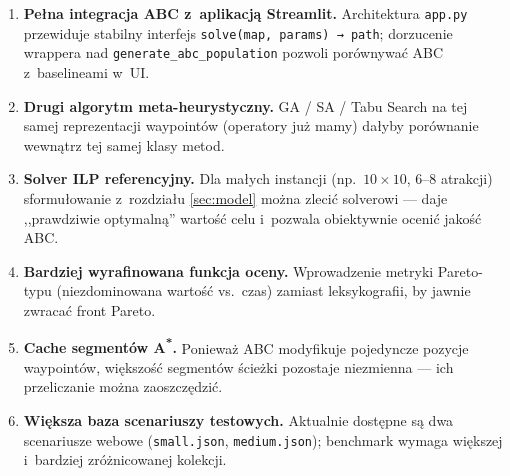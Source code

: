 \begin{enumerate}
    \item \textbf{Pełna integracja ABC z~aplikacją Streamlit.}
          Architektura \texttt{app.py} przewiduje stabilny interfejs
          \texttt{solve(map, params) → path}; dorzucenie wrappera nad
          \texttt{generate\_abc\_population} pozwoli porównywać ABC
          z~baselineami w~UI.
    \item \textbf{Drugi algorytm meta-heurystyczny.} GA / SA / Tabu Search
          na tej samej reprezentacji waypointów (operatory już mamy)
          dałyby porównanie wewnątrz tej samej klasy metod.
    \item \textbf{Solver ILP referencyjny.} Dla małych instancji
          (np.\ $10 \times 10$, 6--8 atrakcji) sformułowanie z~rozdziału
          \ref{sec:model} można zlecić solverowi --- daje ,,prawdziwie
          optymalną'' wartość celu i~pozwala obiektywnie ocenić jakość
          ABC.
    \item \textbf{Bardziej wyrafinowana funkcja oceny.} Wprowadzenie
          metryki Pareto-typu (niezdominowana wartość vs.\ czas) zamiast
          leksykografii, by jawnie zwracać front Pareto.
    \item \textbf{Cache segmentów A\textsuperscript{*}.} Ponieważ ABC
          modyfikuje pojedyncze pozycje waypointów, większość segmentów
          ścieżki pozostaje niezmienna --- ich przeliczanie można
          zaoszczędzić.
    \item \textbf{Większa baza scenariuszy testowych.} Aktualnie dostępne
          są dwa scenariusze webowe (\texttt{small.json},
          \texttt{medium.json}); benchmark wymaga większej i~bardziej
          zróżnicowanej kolekcji.
\end{enumerate}

